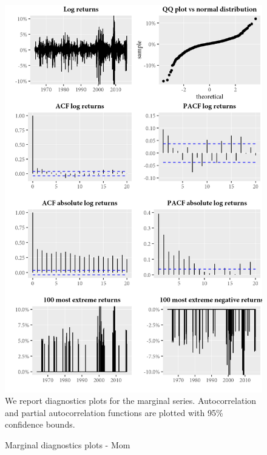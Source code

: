 \begin{figure}[H]
  \caption{Marginal diagnostics plots - Mom}
  \label{diag:marginaldiagMom}
  \toprule
  \centering
  \begin{minipage}{\textwidth}
  \includegraphics[scale=1]{graphics/marginal/MarginalStats.Mom.Estim.png}  
  \bottomrule
  \vspace{3mm}
  \footnotesize
  We report diagnostics plots for the marginal series. Autocorrelation and partial autocorrelation functions are plotted with 95\% confidence bounds. 
  \end{minipage}
\end{figure}
